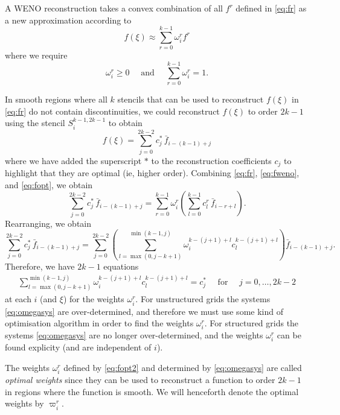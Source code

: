 \documentclass{article}
\newcommand{\for}[0]{\quad \text{ for } \quad}
\numberwithin{equation}{section}
\begin{document}
A WENO reconstruction takes a convex combination of all $f^r$ defined
in \eqref{eq:fr} as a new approximation according to
\begin{equation}
  \label{eq:fweno}
  f(\xi) \approx \sum_{r=0}^{k-1} \omega_i^r f^r
\end{equation}
where we require
\begin{equation}
  \omega_i^r \geq 0 \quad \text{ and } \quad \sum_{r=0}^{k-1} \omega_i^r = 1.
\end{equation}

In smooth regions where all $k$ stencils that can be used to
reconstruct $f(\xi)$ in \eqref{eq:fr} do not contain discontinuities,
we could reconstruct $f(\xi)$ to order $2k-1$ using the stencil
$S_i^{k-1,2k-1}$ to obtain
\begin{equation}
  \label{eq:fopt}
  f(\xi) = \sum_{j=0}^{2k-2} c_j^*\, \bar{f}_{i-(k-1)+j}
\end{equation}
where we have added the superscript $*$ to the reconstruction
coefficients $c_j$ to highlight that they are optimal (ie, higher
order).  Combining \eqref{eq:fr}, \eqref{eq:fweno}, and
\eqref{eq:fopt}, we obtain
\begin{equation}
  \label{eq:fopt2}
  \sum_{j=0}^{2k-2} c_j^*\, \bar{f}_{i-(k-1)+j}
    = \sum_{r=0}^{k-1} \omega_i^r \left( \sum_{l=0}^{k-1} c_l^r\, \bar{f}_{i-r+l} \right).
\end{equation}
Rearranging, we obtain
\begin{equation*}
  \sum_{j=0}^{2k-2} c_j^*\, \bar{f}_{i-(k-1)+j}
    = \sum_{j=0}^{2k-2} \left(
      \sum_{l=\max(0,j-k+1)}^{\min(k-1,j)} \omega_i^{k-(j+1)+l} c_l^{k-(j+1)+l}
    \right) \bar{f}_{i-(k-1)+j}.
\end{equation*}
\newpage
Therefore, we have $2k-1$ equations
\begin{gather}
  \label{eq:omegasys}
  \sum_{l=\max(0,j-k+1)}^{\min(k-1,j)} \omega_i^{k-(j+1)+l} c_l^{k-(j+1)+l} = c_j^*
    \for j = 0,\ldots,2k-2
\end{gather}
at each $i$ (and $\xi$) for the weights $\omega_i^r$.  For
unstructured grids the systems \eqref{eq:omegasys} are
over-determined, and therefore we must use some kind of optimisation
algorithm in order to find the weights $\omega_i^r$.  For structured
grids the systems \eqref{eq:omegasys} are no longer over-determined,
and the weights $\omega_i^r$ can be found explicity (and are
independent of $i$).

The weights $\omega_i^r$ defined by \eqref{eq:fopt2} and determined by
\eqref{eq:omegasys} are called \emph{optimal weights} since they can
be used to reconstruct a function to order $2k-1$ in regions where the
function is smooth.  We will henceforth denote the optimal weights by
$\varpi_i^r$.
\end{document}
